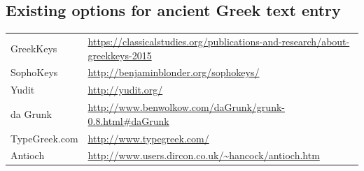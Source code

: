 \documentclass[11pt]{article}
\begin{document}
\subsection{Existing options for ancient Greek text entry}
\label{sec:orga7293a5}

\begin{center}
\begin{tabular}{ll}
GreekKeys & \url{https://classicalstudies.org/publications-and-research/about-greekkeys-2015}\\
SophoKeys & \url{http://benjaminblonder.org/sophokeys/}\\
Yudit & \url{http://yudit.org/}\\
da Grunk & \url{http://www.benwolkow.com/daGrunk/grunk-0.8.html\#daGrunk}\\
TypeGreek.com & \url{http://www.typegreek.com/}\\
Antioch & \url{http://www.users.dircon.co.uk/\~hancock/antioch.htm}\\
\end{tabular}
\end{center}
\end{document}
